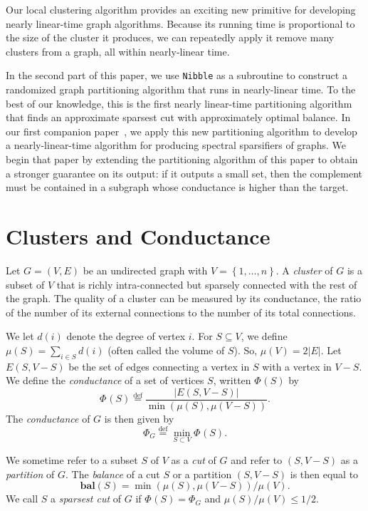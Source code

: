 \documentclass[11pt]{article}
\def\balance#1{\textbf{bal}\left(#1\right)}
\def\defeq{\stackrel{\mathrm{def}}{=}}
\def\setof#1{\left\{#1  \right\}}
\def\sizeof#1{\left|#1  \right|}
\def\setof#1{\left\{#1  \right\}}
\def\conduc#1#2{\Phi_{#1}\left(#2  \right)}
\def\Conduc#1{\Phi_{#1}}
\def\vol#1{\mu \left(#1  \right)}
\begin{document}
Our local clustering algorithm provides an exciting new
  primitive for developing nearly linear-time graph algorithms.
Because its running time is proportional to the size of
  the cluster it produces, we can repeatedly apply it
  remove many clusters from a graph, all within nearly-linear time.

In the second part of this paper,
  we use  \texttt{Nibble}  as a subroutine to
  construct a randomized graph partitioning
  algorithm that runs in nearly-linear time.
To the best of our knowledge, this is the first nearly linear-time
  partitioning algorithm that finds an approximate sparsest cut
  with approximately optimal balance.
In our first companion paper~\cite{SpielmanTengSparsifier}, we apply this new
  partitioning algorithm to develop a
  nearly-linear-time algorithm for producing spectral sparsifiers of graphs.
We begin that paper by extending the partitioning algorithm of this paper
  to obtain a stronger guarantee on its output: if it outputs a small set,
  then the complement must be contained in a subgraph whose conductance is
  higher than the target.

\section{Clusters and Conductance}\label{sec:Def}

Let  $G = (V,E)$ be an undirected graph  with $V = \setof{1,\dotsc ,n}$.
A {\em cluster} of $G$ is a subset of $V$ that is
  richly intra-connected but sparsely connected
  with the rest of the graph.
The quality of a cluster can be measured by its conductance,
  the ratio of the number of its external connections to
  the number of its total connections.

We let $d (i)$ denote the degree of vertex $i$.
For $S \subseteq V$, we define $\vol{S} = \sum_{i \in S} d (i)$
  (often called the volume of $S$).
So, $\vol{V} = 2|E|$.
Let $E(S,V-S)$ be the set of edges connecting a vertex in
  $S$ with a vertex in $V-S$.
We define the {\em conductance} of a set of vertices $S$, written
  $\conduc{}{S}$ by
\[
  \conduc{}{S} \defeq
  \frac{\sizeof{E (S, V - S)}}
       {\min \left(\vol{S}, \vol{V - S} \right)}.
\]
The {\em conductance} of $G$ is then given by
\[
  \Conduc{G}{} \defeq \min_{S \subset V} \conduc{}{S}.
\]

We sometime refer to a subset $S$ of $V$ as a {\em cut} of $G$
  and refer to $(S,V-S)$ as a {\em partition} of $G$.
The {\em balance} of a cut $S$ or a partition $(S,V-S)$ is then equal to
  $$\balance{S} = \min (\vol{S}, \vol{V-S})/\vol{V}.$$
We call $S$ a \textit{sparsest cut}
  of $G$ if $\conduc{}{S} = \Conduc{G}{}$ and $\vol{S}/\vol{V}\leq 1/2$.
\end{document}
